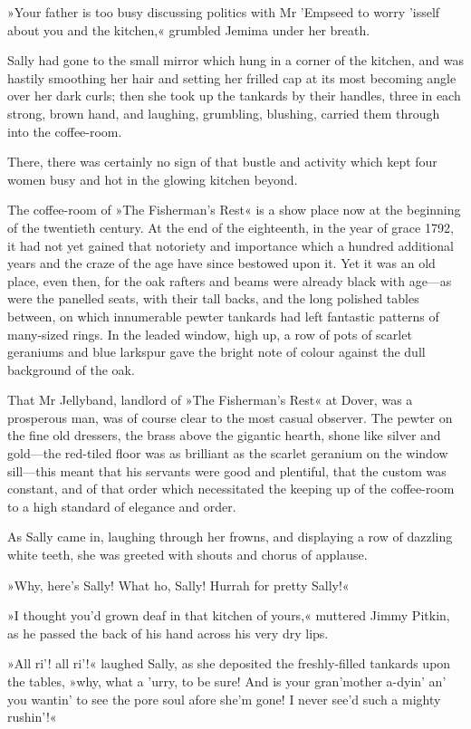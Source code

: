 »Your father is too busy discussing politics with Mr 'Empseed to worry 'isself about you and the kitchen,« grumbled Jemima under her breath.

Sally had gone to the small mirror which hung in a corner of the kitchen, and was hastily smoothing her hair and setting her frilled cap at its most becoming angle over her dark curls; then she took up the tankards by their handles, three in each strong, brown hand, and laughing, grumbling, blushing, carried them through into the coffee-room.

There, there was certainly no sign of that bustle and activity which kept four women busy and hot in the glowing kitchen beyond.

The coffee-room of »The Fisherman's Rest« is a show place now at the beginning of the twentieth century. At the end of the eighteenth, in the year of grace 1792, it had not yet gained that notoriety and importance which a hundred additional years and the craze of the age have since bestowed upon it. Yet it was an old place, even then, for the oak rafters and beams were already black with age—as were the panelled seats, with their tall backs, and the long polished tables between, on which innumerable pewter tankards had left fantastic patterns of many-sized rings. In the leaded window, high up, a row of pots of scarlet geraniums and blue larkspur gave the bright note of colour against the dull background of the oak.

That Mr Jellyband, landlord of »The Fisherman's Rest« at Dover, was a prosperous man, was of course clear to the most casual observer. The pewter on the fine old dressers, the brass above the gigantic hearth, shone like silver and gold—the red-tiled floor was as brilliant as the scarlet geranium on the window sill—this meant that his servants were good and plentiful, that the custom was constant, and of that order which necessitated the keeping up of the coffee-room to a high standard of elegance and order.

As Sally came in, laughing through her frowns, and displaying a row of dazzling white teeth, she was greeted with shouts and chorus of applause.

»Why, here's Sally! What ho, Sally! Hurrah for pretty Sally!«

»I thought you'd grown deaf in that kitchen of yours,« muttered Jimmy Pitkin, as he passed the back of his hand across his very dry lips.

»All ri'! all ri'!« laughed Sally, as she deposited the freshly-filled tankards upon the tables, »why, what a 'urry, to be sure! And is your gran'mother a-dyin' an' you wantin' to see the pore soul afore she'm gone! I never see'd such a mighty rushin'!«

